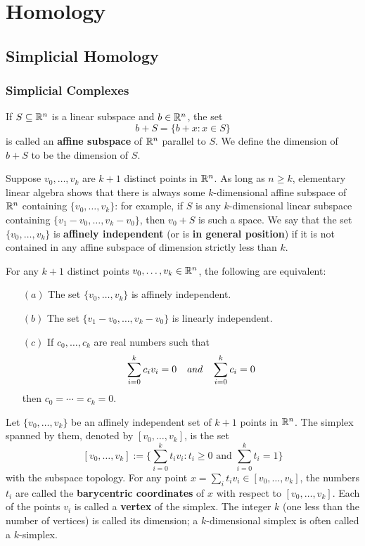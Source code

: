 \chapter{Homology}
\section{Simplicial Homology}
\subsection{Simplicial Complexes}
If $S\subseteq\mathbb{R}^n$ is a linear subspace and $b\in\mathbb{R}^n$, the set
\[b+S=\{b+x:x\in S\}\]
is called an \textbf{affine subspace} of $\mathbb{R}^n$ parallel to $S$. We define the dimension of $b+S$ to be the dimension of $S$.\par
Suppose $v_0,\dots,v_k$ are $k+1$ distinct points in $\mathbb{R}^n$. As long as $n\geq k$, elementary linear algebra shows that there is always some $k$-dimensional affine subspace of $\mathbb{R}^n$ containing $\{v_0,\dots,v_k\}$: for example, if $S$ is any $k$-dimensional linear subspace containing $\{v_1-v_0,\dots,v_k-v_0\}$, then $v_0+S$ is such a space. We say that the set $\{v_0,\dots,v_k\}$ is \textbf{affinely independent} (or is \textbf{in general position}) if it is not contained in any affine subspace of dimension strictly less than $k$.
\begin{proposition}
For any $k+1$ distinct points $v_0,\dots,v_k\in\mathbb{R}^n$, the following are equivalent:
\begin{itemize}
\item[$(a)$] The set $\{v_0,\dots,v_k\}$ is affinely independent.
\item[$(b)$] The set $\{v_1-v_0,\dots,v_k-v_0\}$ is linearly independent.
\item[$(c)$] If $c_0,\dots,c_k$ are real numbers such that
\[\sum_{i=0}^{k}c_iv_i=0\quad\textit{and}\quad \sum_{i=0}^{k}c_i=0\]
then $c_0=\cdots=c_k=0$.
\end{itemize}
\end{proposition}
Let $\{v_0,\dots,v_k\}$ be an affinely independent set of $k+1$ points in $\mathbb{R}^n$. The simplex spanned by them, denoted by $[v_0,\dots,v_k]$, is the set
\[[v_0,\dots,v_k]:=\{\sum_{i=0}^{k}t_iv_i:t_i\geq 0\text{ and }\sum_{i=0}^{k}t_i=1\}\]
with the subspace topology. For any point $x=\sum_{i}t_iv_i\in[v_0,\dots,v_k]$, the numbers $t_i$ are called the \textbf{barycentric coordinates} of $x$ with respect to $[v_0,\dots,v_k]$. Each of the points $v_i$ is called a \textbf{vertex} of the simplex. The integer $k$ (one less than the number of vertices) is called its dimension; a $k$-dimensional simplex is often called a $k$-simplex.\par
